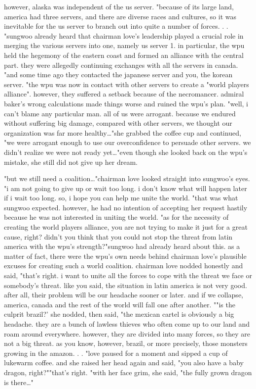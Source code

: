 however, alaska was independent of the us server.
"because of its large land, america had three servers, and there are diverse races and cultures, so it was inevitable for the us server to branch out into quite a number of forces.
.
.
"sungwoo already heard that chairman love's leadership played a crucial role in merging the various servers into one, namely us server 1.
in particular, the wpu held the hegemony of the eastern coast and formed an alliance with the central part.
 they were allegedly continuing exchanges with all the servers in canada.
"and some time ago they contacted the japanese server and you, the korean server.
"the wpu was now in contact with other servers to create a "world players alliance".
however, they suffered a setback because of the necromancer.
 admiral baker's wrong calculations made things worse and ruined the wpu's plan.
"well, i can't blame any particular man.
 all of us were arrogant.
 because we endured without suffering big damage, compared with other servers, we thought our organization was far more healthy…"she grabbed the coffee cup and continued, "we were arrogant enough to use our overconfidence to persuade other servers.
 we didn't realize we were not ready yet…"even though she looked back on the wpu's mistake, she still did not give up her dream.


"but we still need a coalition…"chairman love looked straight into sungwoo's eyes.
 "i am not going to give up or wait too long.
 i don't know what will happen later if i wait too long.
 so, i hope you can help me unite the world.
"that was what sungwoo expected.
 however, he had no intention of accepting her request hastily because he was not interested in uniting the world.
"as for the necessity of creating the world players alliance, you are not trying to make it just for a great cause, right? didn't you think that you could not stop the threat from latin america with the wpu's strength?"sungwoo had already heard about this.
 as a matter of fact, there were the wpu's own needs behind chairman love's plausible excuses for creating such a world coalition.
chairman love nodded honestly and said, "that's right.
 i want to unite all the forces to cope with the threat we face or somebody's threat.
 like you said, the situation in latin america is not very good.
 after all, their problem will be our headache sooner or later.
 and if we collapse, america, canada and the rest of the world will fall one after another.
""is the culprit brazil?' she nodded, then said, "the mexican cartel is obviously a big headache.
 they are a bunch of lawless thieves who often come up to our land and roam around everywhere.
 however, they are divided into many forces, so they are not a big threat.
 as you know, however, brazil, or more precisely, those monsters growing in the amazon.
.
.
"love paused for a moment and sipped a cup of lukewarm coffee.
and she raised her head again and said, "you also have a baby dragon, right?""that's right.
"with her face grim, she said, "the fully grown dragon is there…"

 